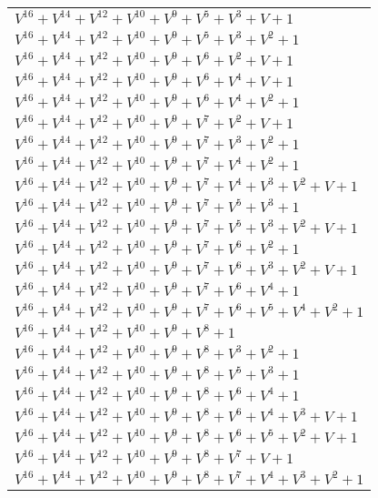 \documentclass[12pt]{article}
\begin{document}
\begin{adjustwidth}{-4cm}{}
\begin{center}
\begin{longtable}{|l|}
$V^{16}  +V^{14}  +V^{12}  +V^{10}  +V^{9}  +V^{5}  +V^{3}  + V + 1$ \\
$V^{16}  +V^{14}  +V^{12}  +V^{10}  +V^{9}  +V^{5}  +V^{3}  +V^{2}  + 1$ \\
$V^{16}  +V^{14}  +V^{12}  +V^{10}  +V^{9}  +V^{6}  +V^{2}  + V + 1$ \\
$V^{16}  +V^{14}  +V^{12}  +V^{10}  +V^{9}  +V^{6}  +V^{4}  + V + 1$ \\
$V^{16}  +V^{14}  +V^{12}  +V^{10}  +V^{9}  +V^{6}  +V^{4}  +V^{2}  + 1$ \\
$V^{16}  +V^{14}  +V^{12}  +V^{10}  +V^{9}  +V^{7}  +V^{2}  + V + 1$ \\
$V^{16}  +V^{14}  +V^{12}  +V^{10}  +V^{9}  +V^{7}  +V^{3}  +V^{2}  + 1$ \\
$V^{16}  +V^{14}  +V^{12}  +V^{10}  +V^{9}  +V^{7}  +V^{4}  +V^{2}  + 1$ \\
$V^{16}  +V^{14}  +V^{12}  +V^{10}  +V^{9}  +V^{7}  +V^{4}  +V^{3}  +V^{2}  + V + 1$ \\
$V^{16}  +V^{14}  +V^{12}  +V^{10}  +V^{9}  +V^{7}  +V^{5}  +V^{3}  + 1$ \\
$V^{16}  +V^{14}  +V^{12}  +V^{10}  +V^{9}  +V^{7}  +V^{5}  +V^{3}  +V^{2}  + V + 1$ \\
$V^{16}  +V^{14}  +V^{12}  +V^{10}  +V^{9}  +V^{7}  +V^{6}  +V^{2}  + 1$ \\
$V^{16}  +V^{14}  +V^{12}  +V^{10}  +V^{9}  +V^{7}  +V^{6}  +V^{3}  +V^{2}  + V + 1$ \\
$V^{16}  +V^{14}  +V^{12}  +V^{10}  +V^{9}  +V^{7}  +V^{6}  +V^{4}  + 1$ \\
$V^{16}  +V^{14}  +V^{12}  +V^{10}  +V^{9}  +V^{7}  +V^{6}  +V^{5}  +V^{4}  +V^{2}  + 1$ \\
$V^{16}  +V^{14}  +V^{12}  +V^{10}  +V^{9}  +V^{8}  + 1$ \\
$V^{16}  +V^{14}  +V^{12}  +V^{10}  +V^{9}  +V^{8}  +V^{3}  +V^{2}  + 1$ \\
$V^{16}  +V^{14}  +V^{12}  +V^{10}  +V^{9}  +V^{8}  +V^{5}  +V^{3}  + 1$ \\
$V^{16}  +V^{14}  +V^{12}  +V^{10}  +V^{9}  +V^{8}  +V^{6}  +V^{4}  + 1$ \\
$V^{16}  +V^{14}  +V^{12}  +V^{10}  +V^{9}  +V^{8}  +V^{6}  +V^{4}  +V^{3}  + V + 1$ \\
$V^{16}  +V^{14}  +V^{12}  +V^{10}  +V^{9}  +V^{8}  +V^{6}  +V^{5}  +V^{2}  + V + 1$ \\
$V^{16}  +V^{14}  +V^{12}  +V^{10}  +V^{9}  +V^{8}  +V^{7}  + V + 1$ \\
$V^{16}  +V^{14}  +V^{12}  +V^{10}  +V^{9}  +V^{8}  +V^{7}  +V^{4}  +V^{3}  +V^{2}  + 1$ \\

\end{longtable}
\end{center}
\end{adjustwidth}
\end{document}
